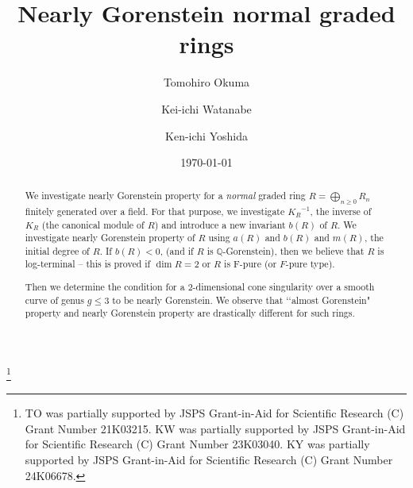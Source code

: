 \documentclass[12pt]{amsart}
\theoremstyle{definition}
\theoremstyle{remark}
\numberwithin{equation}{section}
\newcommand{\KiR}{{K_R}^{-1}}
\newcommand{\Q}{\mathbb Q}
\renewcommand{\:}{\colon}
\begin{document}
\title{Nearly Gorenstein normal graded rings}


\author{Tomohiro Okuma}
\address[Tomohiro Okuma]{Department of Mathematical Sciences, 
Yamagata University,  Yamagata, 990-8560, Japan.}
\author{Kei-ichi Watanabe}
\address[Kei-ichi Watanabe]{Department of Mathematics, College of Humanities and Sciences, 
Nihon University, Setagaya-ku, Tokyo, 156-8550, Japan and 
Organization for the Strategic Coordination of Research and Intellectual Properties, Meiji University
}
\author{Ken-ichi Yoshida}
\address[Ken-ichi Yoshida]{Department of Mathematics, 
College of Humanities and Sciences, 
Nihon University, Setagaya-ku, Tokyo, 156-8550, Japan}
\date{\today}
\thanks{TO was partially supported by JSPS Grant-in-Aid 
for Scientific Research (C) Grant Number 21K03215.
KW  was partially supported by JSPS Grant-in-Aid 
for Scientific Research (C) Grant Number 23K03040.
KY was partially supported by JSPS Grant-in-Aid 
for Scientific Research (C) Grant Number 24K06678.}


\begin{abstract} 
We investigate nearly Gorenstein property for a {\em normal} graded 
ring $R = \bigoplus_{n\ge 0}R_n$  finitely generated over a field. 
For that purpose, we investigate $\KiR$, the inverse of $K_R$ 
(the canonical module of $R$)  
 and introduce a new invariant $b(R)$ of $R$. 
We investigate nearly Gorenstein property of $R$ using $a(R)$ and 
$b(R)$ and $m(R)$, the initial degree of $R$. 
If $b(R)<0$, (and if $R$ is $\Q$-Gorenstein),  
then we believe that $R$ is log-terminal -- this is proved 
if $\dim R=2$ or $R$ is F-pure (or $F$-pure type).
\par
Then we determine the condition for a $2$-dimensional cone 
singularity over a smooth curve of genus $g\le 3$ to be nearly Gorenstein.   
We observe that \lq\lq almost Gorenstein" property and nearly 
Gorenstein property are drastically different for such rings.  
\end{abstract}
\end{document}
